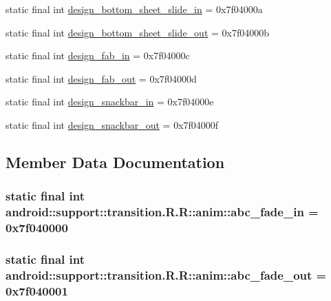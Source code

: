 \begin{CompactItemize}
\item 
static final int \hyperlink{classandroid_1_1support_1_1transition_1_1_r_1_1anim_00cf10f48c615ea14dd1606773151fac}{design\_\-bottom\_\-sheet\_\-slide\_\-in} = 0x7f04000a
\item 
static final int \hyperlink{classandroid_1_1support_1_1transition_1_1_r_1_1anim_92d5d89831ed9a32b226a5209991b2d9}{design\_\-bottom\_\-sheet\_\-slide\_\-out} = 0x7f04000b
\item 
static final int \hyperlink{classandroid_1_1support_1_1transition_1_1_r_1_1anim_64b0af6eb65af266956dc4a39224c335}{design\_\-fab\_\-in} = 0x7f04000c
\item 
static final int \hyperlink{classandroid_1_1support_1_1transition_1_1_r_1_1anim_15f44bf77bfeb81268d44777bd2e41d1}{design\_\-fab\_\-out} = 0x7f04000d
\item 
static final int \hyperlink{classandroid_1_1support_1_1transition_1_1_r_1_1anim_f516e02461dd4a360fb47f190362dc36}{design\_\-snackbar\_\-in} = 0x7f04000e
\item 
static final int \hyperlink{classandroid_1_1support_1_1transition_1_1_r_1_1anim_53a551f74e06275ee11c17b689b4aa48}{design\_\-snackbar\_\-out} = 0x7f04000f
\end{CompactItemize}


\subsection{Member Data Documentation}
\hypertarget{classandroid_1_1support_1_1transition_1_1_r_1_1anim_3b8ae234c9fbd06f16796d058de1eeb4}{
\subsubsection[{abc\_\-fade\_\-in}]{\setlength{\rightskip}{0pt plus 5cm}static final int android::support::transition.R.R::anim::abc\_\-fade\_\-in = 0x7f040000}}
\label{classandroid_1_1support_1_1transition_1_1_r_1_1anim_3b8ae234c9fbd06f16796d058de1eeb4}


\hypertarget{classandroid_1_1support_1_1transition_1_1_r_1_1anim_450c5e272a22c653d9d268baea3cd9ac}{
\subsubsection[{abc\_\-fade\_\-out}]{\setlength{\rightskip}{0pt plus 5cm}static final int android::support::transition.R.R::anim::abc\_\-fade\_\-out = 0x7f040001}}
\label{classandroid_1_1support_1_1transition_1_1_r_1_1anim_450c5e272a22c653d9d268baea3cd9ac}


